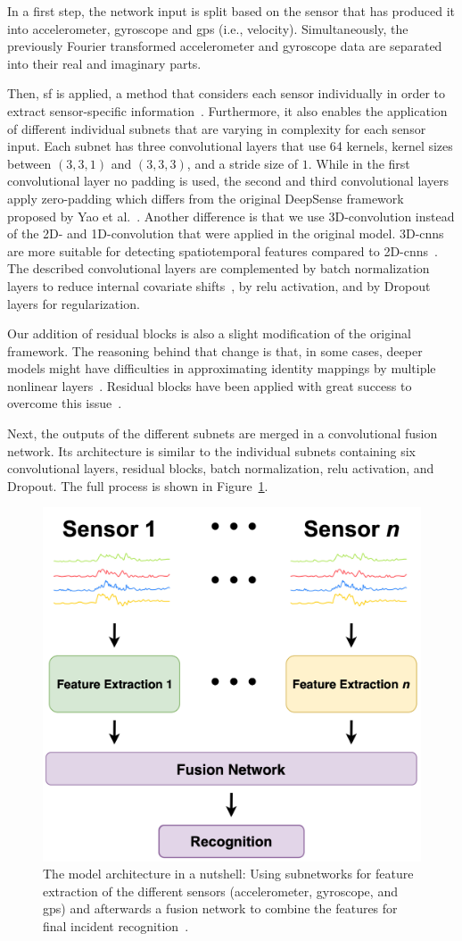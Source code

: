 In a first step, the network input is split based on the sensor that has produced it into accelerometer, gyroscope and \ac{gps} (i.e., velocity).
Simultaneously, the previously Fourier transformed accelerometer and gyroscope data are separated into their real and imaginary parts.

Then, \ac{sf} is applied, a method that considers each sensor individually in order to extract sensor-specific information~\cite{elmenreich2002sensor}. 
Furthermore, it also enables the application of different individual subnets that are varying in complexity for each sensor input.
Each subnet has three convolutional layers that use 64 kernels, kernel sizes between $(3,3,1)$ and $(3,3,3)$, and a stride size of $1$.
While in the first convolutional layer no padding is used, the second and third convolutional layers apply zero-padding which differs from the original DeepSense framework proposed by Yao et al.~\cite{yao2017deepsense}. 
Another difference is that we use 3D-convolution instead of the 2D- and 1D-convolution that were applied in the original model. 
3D-\acp{cnn} are more suitable for detecting spatiotemporal features compared to 2D-\acp{cnn}~\cite{tran2015learning}. 
The described convolutional layers are complemented by batch normalization layers to reduce internal covariate shifts~\cite{ioffe2015batch}, by \ac{relu} activation, and by Dropout layers for regularization.

Our addition of residual blocks is also a slight modification of the original framework. 
The reasoning behind that change is that, in some cases, deeper models might have difficulties in approximating identity mappings by multiple nonlinear layers~\cite{he2016deep}. 
Residual blocks have been applied with great success to overcome this issue~\cite{he2016deep}.

Next, the outputs of the different subnets are merged in a convolutional fusion network. 
Its architecture is similar to the individual subnets containing six convolutional layers, residual blocks, batch normalization, \ac{relu} activation, and Dropout. 
The full process is shown in Figure~\ref{fig:sfn}.

\begin{figure}[t]
\centering
    \includegraphics[width=0.4\columnwidth]{fig/sensor-and-fusion-networks.png}
    \caption{The model architecture in a nutshell: Using subnetworks for feature extraction of the different sensors (accelerometer, gyroscope, and \ac{gps}) and afterwards a fusion network to combine the features for final incident recognition~\cite{chen2021deep}.}
    \label{fig:sfn}
\end{figure}

